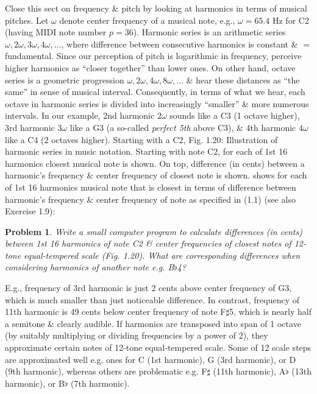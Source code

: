 \documentclass{article}
\newtheorem{problem}{Problem}
\begin{document}
\begin{itemize}
\begin{itemize}
\begin{itemize}
			Close this sect on frequency \& pitch by looking at harmonics in terms of musical pitches. Let $\omega$ denote center frequency of a musical note, e.g., $\omega = 65.4$ Hz for C2 (having MIDI note number $p = 36$). Harmonic series is an arithmetic series $\omega,2\omega,3\omega,4\omega,\ldots$, where difference between consecutive harmonics is constant \& $=$ fundamental. Since our perception of pitch is logarithmic in frequency, perceive higher harmonics as ``closer together'' than lower ones. On other hand, octave series is a geometric progression $\omega,2\omega,4\omega,8\omega,\ldots$ \& hear these distances as ``the same'' in sense of musical interval. Consequently, in terms of what we hear, each octave in harmonic series is divided into increasingly ``smaller'' \& more numerous intervals. In our example, 2nd harmonic $2\omega$ sounds like a C3 (1 octave higher), 3rd harmonic $3\omega$ like a G3 (a so-called {\it perfect 5th} above C3), \& 4th harmonic $4\omega$ like a C4 (2 octaves higher). Starting with a C2, {\sf Fig. 1.20: Illustration of harmonic series in music notation. Starting with note C2, for each of 1st 16 harmonics closest musical note is shown. On top, difference (in cents) between a harmonic's frequency \& center frequency of closest note is shown.} shows for each of 1st 16 harmonics musical note that is closest in terms of difference between harmonic's frequency \& center frequency of note as specified in (1.1) (see also Exercise 1.9):
			\begin{problem}
				Write a small computer program to calculate differences (in cents) between 1st 16 harmonics of note C2 \& center frequencies of closest notes of 12-tone equal-tempered scale ({\sf Fig. 1.20}). What are corresponding differences when considering harmonics of another note e.g. B$\flat$4?
			\end{problem}
			E.g., frequency of 3rd harmonic is just 2 cents above center frequency of G3, which is much smaller than just noticeable difference. In contrast, frequency of 11th harmonic is 49 cents below center frequency of note F$\sharp$5, which is nearly half a semitone \& clearly audible. If harmonics are transposed into span of 1 octave (by suitably multiplying or dividing frequencies by a power of 2), they approximate certain notes of 12-tone equal-tempered scale. Some of 12 scale steps are approximated well e.g. ones for C (1st harmonic), G (3rd harmonic), or D (9th harmonic), whereas others are problematic e.g. F$\sharp$ (11th harmonic), A$\flat$ (13th harmonic), or B$\flat$ (7th harmonic).
			

\end{itemize}
\end{itemize}
\end{itemize}
\end{document}
